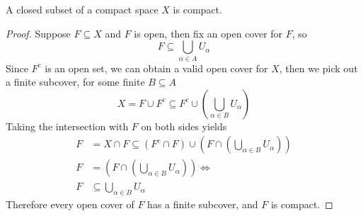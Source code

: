 \documentclass[../../main.tex]{subfiles}
\begin{document}
\begin{wts}
A closed subset of a compact space $X$ is compact.
\end{wts}
\begin{proof}
Suppose $F\subseteq X$ and $F$ is open, then fix an open cover for $F$, so
\[
F\subseteq \bigcup_{\alpha\in A}U_\alpha
\]
Since $F^c$ is an open set, we can obtain a valid open cover for $X$, then we pick out a finite subcover, for some finite $B\subseteq A$
\[
X = F\cup F^c \subseteq F^c\cup \left(\bigcup_{\alpha\in B}U_\alpha\right)
\]
Taking the intersection with $F$ on both sides yields
\begin{align*}
    F &= X\cap F \subseteq (F^c\cap F)\cup \left(F\cap\left(\bigcup_{\alpha\in B}U_\alpha\right)\right)\\
    F &= \left(F\cap\left(\bigcup_{\alpha\in B}U_\alpha\right)\right)\iff\\
    F&\subseteq \bigcup_{\alpha\in B}U_\alpha
\end{align*}
Therefore every open cover of $F$ has a finite subcover, and $F$ is compact.
\end{proof}
\end{document}
